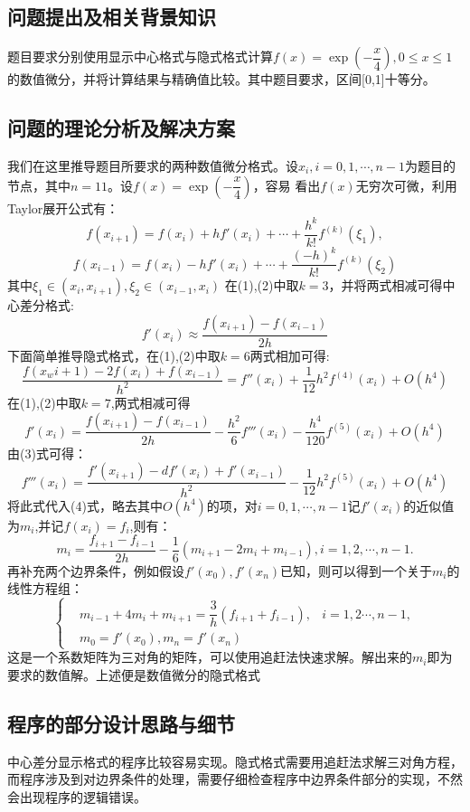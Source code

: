 \documentclass{ctexart}
\begin{document}
\subsection{问题提出及相关背景知识}
题目要求分别使用显示中心格式与隐式格式计算$f(x)=\exp(-\dfrac{x}{4}),0\leq x \leq 1$的数值微分，并将计算结果与精确值比较。其中题目要求，区间[0,1]十等分。
\subsection{问题的理论分析及解决方案}
我们在这里推导题目所要求的两种数值微分格式。设$x_i,i=0,1,\cdots,n-1$为题目的节点，其中$n=11$。设$f(x)=\exp(-\dfrac{x}{4})$，容易
看出$f(x)$无穷次可微，利用Taylor展开公式有：
\begin{equation} f(x_{i+1})=f(x_i)+hf'(x_i)+\cdots+\dfrac{h^k}{k!}f^{(k)}(\xi_1),
\end{equation} 
\begin{equation} f(x_{i-1})=f(x_i)-hf'(x_i)+\cdots+\dfrac{(-h)^{k}}{k!}f^{(k)}(\xi_2)\end{equation}
其中$\xi_1 \in (x_i,x_{i+1}),\xi_2 \in (x_{i-1},x_i)$
在(1),(2)中取$k=3$，并将两式相减可得中心差分格式:
\[f'(x_i)\approx \dfrac{f(x_{i+1})-f(x_{i-1})}{2h}\]
下面简单推导隐式格式，在(1),(2)中取$k=6$两式相加可得:
\begin{equation}
\dfrac{f(x_w{i+1})-2f(x_i)+f(x_{i-1})}{h^2}=f''(x_i)+\dfrac{1}{12}h^2f^{(4)}(x_i)+O(h^4)
\end{equation}
在(1),(2)中取$k=7$,两式相减可得
\begin{equation}
f'(x_i)=\dfrac{f(x_{i+1})-f(x_{i-1})}{2h}-\dfrac{h^2}{6}f'''(x_i)-\dfrac{h^4}{120}f^{(5)}(x_i)+O(h^4)
\end{equation}
由(3)式可得：
\[f'''(x_i)=\dfrac{f'(x_{i+1})-df'(x_i)+f'(x_{i-1})}{h^2}-\dfrac{1}{12}h^2f^{(5)}(x_i)+O(h^4)\]
将此式代入(4)式，略去其中$O(h^4)$的项，对$i=0,1,\cdots,n-1$记$f'(x_i)$的近似值为$m_i$,并记$f(x_i)=f_i$,则有：
\[ m_i=\dfrac{f_{i+1}-f_{i-1}}{2h}-\dfrac{1}{6}(m_{i+1}-2m_i+m_{i-1}),i=1,2,\cdots,n-1.\]
再补充两个边界条件，例如假设$f'(x_0),f'(x_n)$已知，则可以得到一个关于$m_i$的线性方程组：
$$\left\{\begin{aligned}
& m_{i-1}+4m_i+m_{i+1}=\dfrac{3}{h}(f_{i+1}+f_{i-1}),&i=1,2\cdots,n-1, \\
& m_0=f'(x_0),m_n=f'(x_n)
\end{aligned}
\right.
$$
这是一个系数矩阵为三对角的矩阵，可以使用追赶法快速求解。解出来的$m_i$即为要求的数值解。上述便是数值微分的隐式格式
\subsection{程序的部分设计思路与细节}
中心差分显示格式的程序比较容易实现。隐式格式需要用追赶法求解三对角方程，而程序涉及到对边界条件的处理，需要仔细检查程序中边界条件部分的实现，不然会出现程序的逻辑错误。
\end{document}
